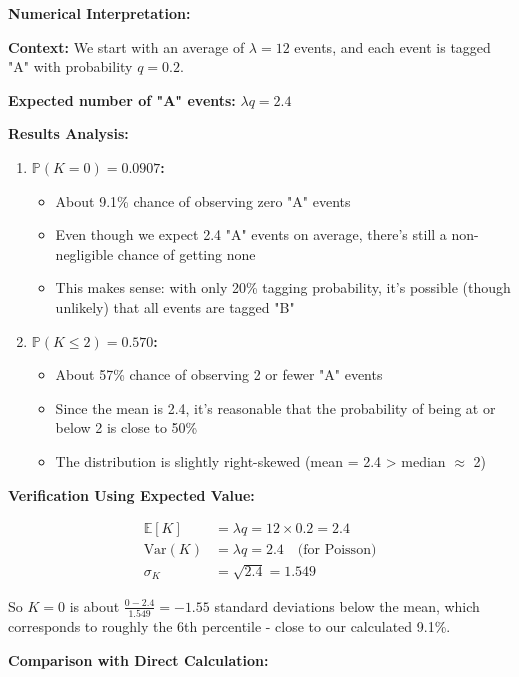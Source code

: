 \documentclass[12pt]{article}
\begin{document}
\begin{explanation}
\textbf{Numerical Interpretation:}

\textbf{Context:} We start with an average of \(\lambda = 12\) events, and each event is tagged "A" with probability \(q = 0.2\).

\textbf{Expected number of "A" events:} \(\lambda q = 2.4\)

\textbf{Results Analysis:}

\begin{enumerate}
    \item \textbf{\(\mathbb{P}(K = 0) = 0.0907\):}
    \begin{itemize}
        \item About 9.1\% chance of observing zero "A" events
        \item Even though we expect 2.4 "A" events on average, there's still a non-negligible chance of getting none
        \item This makes sense: with only 20\% tagging probability, it's possible (though unlikely) that all events are tagged "B"
    \end{itemize}

    \item \textbf{\(\mathbb{P}(K \leq 2) = 0.570\):}
    \begin{itemize}
        \item About 57\% chance of observing 2 or fewer "A" events
        \item Since the mean is 2.4, it's reasonable that the probability of being at or below 2 is close to 50\%
        \item The distribution is slightly right-skewed (mean = 2.4 > median $\approx$ 2)
    \end{itemize}
\end{enumerate}

\textbf{Verification Using Expected Value:}

\begin{align*}
\mathbb{E}[K] &= \lambda q = 12 \times 0.2 = 2.4 \\
\text{Var}(K) &= \lambda q = 2.4 \quad \text{(for Poisson)} \\
\sigma_K &= \sqrt{2.4} = 1.549
\end{align*}

So \(K = 0\) is about \(\frac{0 - 2.4}{1.549} = -1.55\) standard deviations below the mean, which corresponds to roughly the 6th percentile - close to our calculated 9.1\%.

\textbf{Comparison with Direct Calculation:}


\end{explanation}
\end{document}

